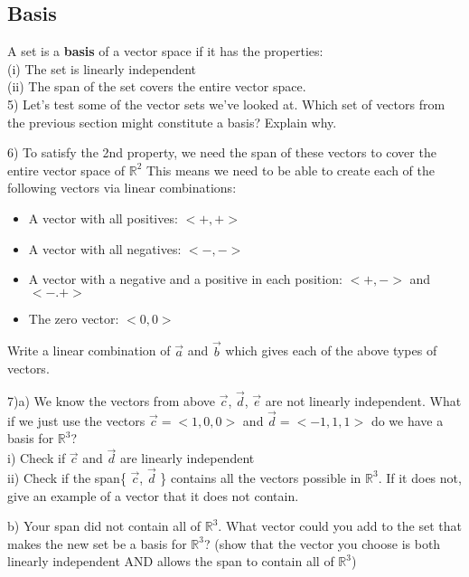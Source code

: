 \documentclass{article}
\begin{document}
\begin{flushleft}
\vspace{1in}

\section*{Basis}
A set is a \textbf{basis} of a vector space if it has the properties:\\
(i) The set is linearly independent\\
(ii) The span of the set covers the entire vector space.\\
\vspace{0.1in}
5) Let's test some of the vector sets we've looked at. Which set of vectors from the previous section might constitute a basis? Explain why.

\vspace{1in}

6) To satisfy the 2nd property, we need the span of these vectors to cover the entire vector space of $\mathbb{R}^2 $ This means we need to be able to create each of the following vectors via linear combinations:\\
\begin{itemize}
\item A vector with all positives: $<+,+>$
\item A vector with all negatives: $<-,->$
\item A vector with a negative and a positive in each position: $<+,->$ and $<-.+>$
\item The zero vector: $<0,0>$
\end{itemize}
Write a linear combination of $\vec{a}$ and $\vec{b}$ which gives each of the above types of vectors.

\vspace{2in}

7)a) We know the vectors from above $\vec{c}$, $\vec{d}$, $\vec{e}$ are not linearly independent. What if we just use the vectors $\vec{c}=<1,0,0>$ and $\vec{d}=<-1,1,1>$ do we have a basis for $\mathbb{R}^3$?\\
i) Check if $\vec{c}$ and $\vec{d}$ are linearly independent\\
ii) Check if the span\{ $\vec{c}$, $\vec{d}$ \} contains all the vectors possible in $\mathbb{R}^3$. If it does not, give an example of a vector that it does not contain.

\vspace{3in}

b) Your span did not contain all of $\mathbb{R}^3$. What vector could you add to the set that makes the new set be a basis for $\mathbb{R}^3$? (show that the vector you choose is both linearly independent AND allows the span to contain all of $\mathbb{R}^3$)

\vspace{2in}


\end{flushleft}
\end{document}
